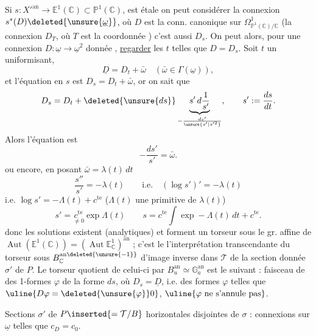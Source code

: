  Si $s:X'^{\mathrm{an}}\longrightarrow\mathbb E^1(\mathbb C)\subset\mathbb P^1(\mathbb C)$, est étale on peut considérer la connexion  $s^*(D)\deleted{\unsure{\underline\omega}}$, où $D$ est la conn. canonique sur $\Omega^1_{\mathbb P^1(\mathbb C)/\mathbb C}$ \deleted{$\unsure{\varphi}$} (la connexion $D_T$, où $T$ est la coordonnée ) c'est aussi $D_s$. On peut alors,  pour une connexion  $D:\underline\omega\longrightarrow\underline\omega^2$ donnée , \uline{regarder} les $t$ telles que $D=D_s$.  Soit $t$ un uniformisant, 
\[
\underline D=D_t+\bar\omega\quad(\bar\omega\in\Gamma(\underline\omega)),
\]
et l'équation en $s$ est $D_s=D_t+\bar\omega$, or on sait que
\[
D_s=D_t+\deleted{\unsure{ds}}\underbrace{s'\,d\frac1{s'}}_{-\frac{ds'}{\unsure{s'|s'^2}}},\qquad s':=\frac{ds}{dt}.
\]
Alors l'équation est
\[
-\frac{ds'}{s'}=\bar\omega.
\]
ou encore, en posant $\bar\omega=\lambda(t)\,dt$
\[
\frac{s''}{s'}=-\lambda(t)\qquad\text{i.e.}\quad(\log s')'=-\lambda(t)
\]
i.e. $\log s'=-\Lambda(t)+c^{\mathrm{te}}$ ($\Lambda(t)$ une primitive de $\lambda(t)$)
\[
s'=\underset{\ne0}{c^{\mathrm{te}}}\exp\Lambda(t)\qquad
s=c^{\mathrm{te}}\int\exp-\Lambda(t)\,dt+c^{\mathrm{te}}.
\]
donc les solutions existent (analytiques) et  forment un torseur  sous le gr. affine de $\operatorname{Aut}(\mathbb E^1(\mathbb C))=(\operatorname{Aut}\mathbb E^1_{\mathbb C})^{\mathrm{an}}$ ; c'est le  l'interprétation transcendante du torseur \deleted{$\unsure{\longrightarrow}$} sous $B_{\mathbb C}^{\mathrm{an}\deleted{\unsure{-1}}}$  d'image inverse dans $\mathcal T$ de la section donnée $\sigma'$ de $P$. Le torseur quotient de celui-ci par $B_u^{\mathrm{an}}\simeq\mathbb G_a^{\mathrm{an}}$ est le suivant :
 faisceau de  des 1-formes $\varphi$ de la forme $ds$, où $D_s=\underline D$, i.e. des formes $\varphi$ telles que $\uline{D\varphi=\deleted{\unsure{\varphi}}0}$, $\uline{\varphi\text{ ne s'annule pas}}$.

 Sections $\sigma'$  de $P\inserted{=\mathcal T/B}$ horizontales disjointes de $\sigma$ : connexions sur $\underline\omega$ telles que $c_D=c_0$.

